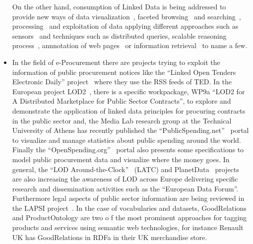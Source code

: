 \begin{itemize}
 On the other hand, consumption of Linked Data is being addressed to provide new ways of data visualization~\cite{DBLP:journals/semweb/DadzieR11,hoga-etal-2011-swse-JWS}, 
 faceted browsing~\cite{Pietriga06fresnel, citeulike:8529753,Sparallax} and searching~\cite{hoga-etal-2011-swse-JWS}, processing~\cite{Harth:2011:SIP:1963192.1963318} and exploitation of data applying 
 different approaches such as sensors~\cite{Jeung:2010:EMM:1850003.1850235,ontology-search} and techniques such as distributed queries\cite{Hartig09executingsparql,Ankolekar07thetwo,sparqlOpt}, 
 scalable reasoning process~\cite{Urbani2010WebPIE,HoganHarthPolleres2009,DBLP:conf/semweb/HoganPPD10}, 
 annnotation of web pages~\cite{rdfa-primer} or information retrieval~\cite{Pound} to name a few.
  
 \item In the field of e-Procurement there are projects trying to exploit the 
 information of public procurement notices like the ``Linked Open Tenders Electronic Daily'' project~\cite{loted} 
 where they use the RSS feeds of TED.  In the European project LOD2~\cite{lod2-project}, there is a specific workpackage, 
 WP9a ``LOD2 for A Distributed Marketplace for Public Sector Contracts'', to explore and demonstrate the 
 application of linked data principles for procuring contracts in the public sector and, 
 the Media Lab research group at the Technical University of Athens has recently published the 
 ``PublicSpending.net''~\cite{publicspending} portal to visualize and manage statistics about public spending around the world. 
 Finally the ``OpenSpending.org''~\cite{open-spending} portal also presents some specifications to model public procurement data and 
 visualize where the money goes. In general, the ``LOD Around-the-Clock''~\cite{latc-project} (LATC) and PlanetData~\cite{planet-data-project} 
 projects are also increasing the awareness of LOD across Europe delivering specific research and dissemination activities such as the 
 ``European Data Forum''. Furthermore legal aspects of public sector information are being reviewed in the 
 LAPSI project~\cite{lapsi-project}. In the case of vocabularies and datasets, GoodRelations and ProductOntology are two o
 f the most prominent approaches for tagging products and services using semantic web technologies, 
 for instance Renault UK has GoodRelations in RDFa in their UK merchandise store.
 

\end{itemize}
